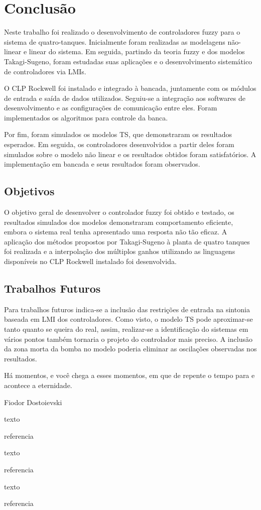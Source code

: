 %

\chapter{Conclusão} \label{capConclusao}


Neste trabalho foi realizado o desenvolvimento de controladores fuzzy para o sistema de quatro-tanques. Inicialmente foram realizadas as modelagens não-linear e linear do sistema. Em seguida, partindo da teoria fuzzy e dos modelos Takagi-Sugeno, foram estudadas suas aplicações e o desenvolvimento sistemático de controladores via LMIs.

O CLP Rockwell foi instalado e integrado à bancada, juntamente com os módulos de entrada e saída de dados utilizados. Seguiu-se a integração aos softwares de desenvolvimento e as configurações de comunicação entre eles. Foram implementados os algoritmos para controle da banca.

Por fim, foram simulados os modelos TS, que demonstraram os resultados esperados. Em seguida, os controladores desenvolvidos a partir deles foram simulados sobre o modelo não linear e os resultados obtidos foram satisfatórios. A implementação em bancada e seus resultados foram observados.

\section{Objetivos}
O objetivo geral de desenvolver o controlador fuzzy foi obtido e testado, os resultados simulados dos modelos demonstraram comportamento eficiente, embora o sistema real tenha apresentado uma resposta não tão eficaz. A aplicação dos métodos propostos por Takagi-Sugeno à planta de quatro tanques foi realizada e a interpolação dos múltiplos ganhos utilizando as linguagens disponíveis no CLP Rockwell instalado foi desenvolvida.

\section{Trabalhos Futuros}
Para trabalhos futuros indica-se a inclusão das restrições de entrada na sintonia baseada em LMI dos controladores. Como visto, o modelo TS pode aproximar-se tanto quanto se queira do real, assim, realizar-se a identificação do sistemas em vários pontos também tornaria o projeto do controlador mais preciso. A inclusão da zona morta da bomba no modelo poderia eliminar as oscilações observadas nos resultados.

\epigraph{Há momentos, e você chega a esses momentos, em que de repente o tempo para e acontece a eternidade.}{Fiodor Dostoievski}

\epigraph{texto}{referencia}
\epigraph{texto}{referencia}
\epigraph{texto}{referencia}

%

